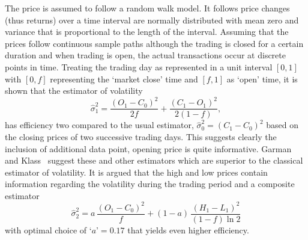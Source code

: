 The price is assumed to follow a random walk model. It follows price changes (thus returns) over a time interval are normally distributed with mean zero and variance that is proportional to the length of the interval. Assuming that the prices follow continuous sample paths although the trading is closed for a certain duration and when trading is open, the actual transactions occur at discrete points in time. Treating the trading day as represented in a unit interval $[0,1]$ with $[0,f]$ representing the `market close' time and $[f,1]$ as `open' time, it is shown that the estimator of volatility
	\begin{equation}\label{eqn:estvol}
	\hat{\sigma}_1^2= \dfrac{(O_1 - C_0)^2}{2f} + \dfrac{(C_1 - O_1)^2}{2(1-f)},
	\end{equation}
has efficiency two compared to the usual estimator, $\hat{\sigma}^2_0=(C_1 - C_0)^2$ based on the closing prices of two successive trading days. This suggests clearly the inclusion of additional data point, opening price is quite informative. Garman and Klass~\cite{klass1980} suggest these and other estimators which are superior to the classical estimator of volatility. It is argued that the high and low prices contain information regarding the volatility during the trading period and a composite estimator
	\begin{equation}\label{eqn:compositeest}
	\hat{\sigma}_2^2= a\,\dfrac{(O_1 - C_0)^2}{f} + (1-a)\, \dfrac{(H_1 - L_1)^2}{(1-f) \ln 2}
	\end{equation}
with optimal choice of `$a$'$=0.17$ that yields even higher efficiency.


